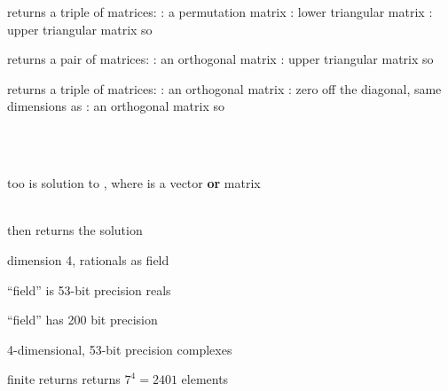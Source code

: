 \documentclass[a4paper]{article}
\begin{document}
\begin{multicols*}{3}
%
 returns a triple of matrices:    \BreakLineAndIndent
{}: a permutation matrix        \BreakLineAndIndent
{}: lower triangular matrix     \BreakLineAndIndent
{}: upper triangular matrix     \BreakLineAndIndent
so 

%
 returns a pair of matrices:      \BreakLineAndIndent
{}: an orthogonal matrix        \BreakLineAndIndent
{}: upper triangular matrix     \BreakLineAndIndent
so 

%
 returns a triple of matrices:   \BreakLineAndIndent
{}: an orthogonal matrix        \BreakLineAndIndent
{}: zero off the diagonal, same dimensions as  \BreakLineAndIndent
{}: an orthogonal matrix        \BreakLineAndIndent
so 

%
\\
\\


  too \BreakLineAndIndent
 is solution to , where  is a vector {\bf or} matrix

\\
\BreakLineAndIndent
 then  returns the solution 


dimension 4, rationals as field

``field'' is 53-bit precision reals

 \BreakLineAndIndent
 ``field'' has 200 bit precision

4-dimensional, 53-bit precision complexes

finite          \BreakLineAndIndent
{} returns       \BreakLineAndIndent
{} returns $7^4=2401$ elements



\end{multicols*}
\end{document}
